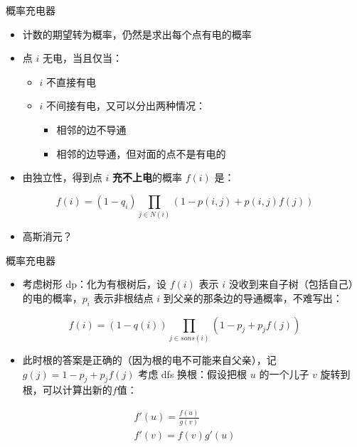 \documentclass{beamer}
\begin{document}
    \begin{frame}{概率充电器}
        \begin{itemize}
            \setlength{\itemsep}{10pt}
            \item 计数的期望转为概率，仍然是求出每个点有电的概率
            \item 点 $i$ 无电，当且仅当：
            \begin{itemize}
                \item $i$ 不直接有电
                \item $i$ 不间接有电，又可以分出两种情况：
                \begin{itemize}
                    \item 相邻的边不导通
                    \item 相邻的边导通，但对面的点不是有电的
                \end{itemize}
            \end{itemize}
            \item 由独立性，得到点 $i$ \textbf{充不上电}的概率 $f(i)$ 是：
        \end{itemize}
        $$
            f(i)=(1-q_i)\prod_{j\in N(i)}\left(1-p(i,j)+p(i,j)f(j)\right)
        $$
        \begin{itemize}
            \setlength{\itemsep}{10pt}
            \item 高斯消元？
        \end{itemize}
    \end{frame}

    \begin{frame}{概率充电器}
        \begin{itemize}
            \setlength{\itemsep}{10pt}
            \item 考虑树形 dp：化为有根树后，设 $f(i)$ 表示 $i$ 没收到来自子树（包括自己）的电的概率，$p_i$ 表示非根结点 $i$ 到父亲的那条边的导通概率，不难写出：
        \end{itemize}
        $$
            f(i) = (1-q(i))\prod_{j \in sons(i)}\left(1-p_j+p_jf(j)\right)
        $$
        \begin{itemize}
            \setlength{\itemsep}{10pt}
            \item 此时根的答案是正确的（因为根的电不可能来自父亲），记 $g(j)=1-p_j+p_jf(j)$
            考虑 dfs 换根：假设把根 $u$ 的一个儿子 $v$ 旋转到根，可以计算出新的$f$值：
        \end{itemize}
        \begin{gather*}
            f'(u)=\frac{f(u)}{g(v)}\\
            f'(v) = f(v)g'(u)
        \end{gather*}
    \end{frame}
\end{document}
